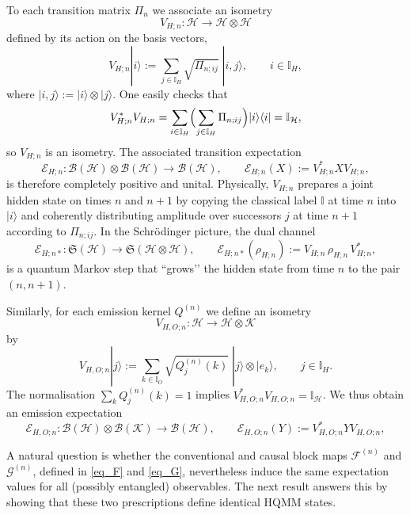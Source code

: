 \documentclass[11pt, reco]{article}
\begin{document}
To each transition matrix \(\Pi_n\) we associate an isometry
\[
V_{H;n}:\mathcal{H}\longrightarrow\mathcal{H}\otimes\mathcal{H}
\]
defined by its action on the basis vectors,
\begin{equation}\label{eq:VHn}
V_{H;n}|i\rangle
:=
\sum_{j\in\mathbb{I}_H}\sqrt{\Pi_{n;ij}}\;|i,j\rangle,
\qquad i\in\mathbb{I}_H,
\end{equation}
where \(|i,j\rangle := |i\rangle\otimes|j\rangle\). One easily checks that
\[
V_{H;n}^{*}V_{H;n}
=
\sum_{i\in\mathbb{I}_H}\Bigl(\sum_{j\in\mathbb{I}_H}\Pi_{n;ij}\Bigr)|i\rangle\langle i|
=
\mathbb{I}_{\mathcal{H}},
\]
so \(V_{H;n}\) is an isometry. The associated transition expectation
\[
\mathcal{E}_{H;n}:\mathcal{B}(\mathcal{H})\otimes\mathcal{B}(\mathcal{H})\to\mathcal{B}(\mathcal{H}),\qquad
\mathcal{E}_{H;n}(X):=V_{H;n}^{*}X V_{H;n},
\]
is therefore completely positive and unital. Physically, \(V_{H;n}\) prepares a joint hidden state on times \(n\) and \(n+1\) by copying the classical label \(\mathbb{I}\) at time \(n\) into \(|i\rangle\) and coherently distributing amplitude over successors \(j\) at time \(n+1\) according to \(\Pi_{n;ij}\). In the Schrödinger picture, the dual channel
\[
\mathcal{E}_{H;n*}:\mathfrak{S}(\mathcal{H})\to\mathfrak{S}(\mathcal{H}\otimes\mathcal{H}),\qquad
\mathcal{E}_{H;n*}(\rho_{H;n}) := V_{H;n}\,\rho_{H;n}\,V_{H;n}^{*},
\]
is a quantum Markov step that “grows’’ the hidden state from time \(n\) to the pair \((n,n+1)\).

Similarly, for each emission kernel \(Q^{(n)}\) we define an isometry
\[
V_{H,O;n}:\mathcal{H}\longrightarrow\mathcal{H}\otimes\mathcal{K}
\]
by
\begin{equation}\label{eq:VHOn}
V_{H,O;n}|j\rangle
:=
\sum_{k\in\mathbb{I}_O}\sqrt{Q^{(n)}_j(k)}\;|j\rangle\otimes|e_k\rangle,
\qquad j\in\mathbb{I}_H.
\end{equation}
The normalisation \(\sum_k Q^{(n)}_j(k)=1\) implies \(V_{H,O;n}^{*}V_{H,O;n}=\mathbb{I}_{\mathcal{H}}\). We thus obtain an emission expectation
\[
\mathcal{E}_{H,O;n}:\mathcal{B}(\mathcal{H})\otimes\mathcal{B}(\mathcal{K})\to\mathcal{B}(\mathcal{H}),\qquad
\mathcal{E}_{H,O;n}(Y):=V_{H,O;n}^{*}Y V_{H,O;n},
\]


A natural question is whether the conventional and causal block maps \(\mathcal{F}^{(n)}\) and \(\mathcal{G}^{(n)}\), defined in \eqref{eq_F} and \eqref{eq_G}, nevertheless induce the same expectation values for all (possibly entangled) observables. The next result answers this by showing that  these two prescriptions define identical HQMM states.
\end{document}
